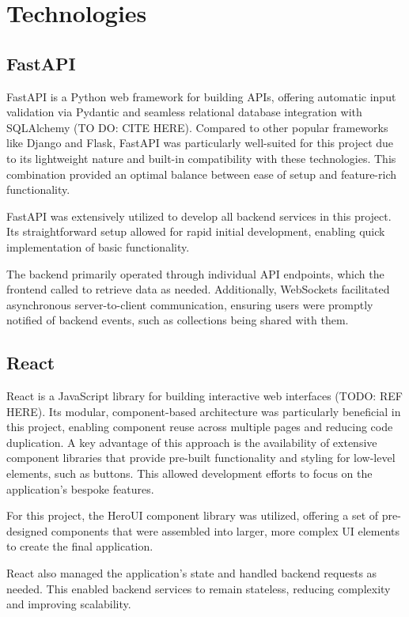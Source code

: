 \section{Technologies}
\subsection{FastAPI}
FastAPI is a Python web framework for building APIs, offering automatic input validation via Pydantic and seamless relational database integration with SQLAlchemy (TO DO: CITE HERE). Compared to other popular frameworks like Django and Flask, FastAPI was particularly well-suited for this project due to its lightweight nature and built-in compatibility with these technologies. This combination provided an optimal balance between ease of setup and feature-rich functionality.

FastAPI was extensively utilized to develop all backend services in this project. Its straightforward setup allowed for rapid initial development, enabling quick implementation of basic functionality.

The backend primarily operated through individual API endpoints, which the frontend called to retrieve data as needed. Additionally, WebSockets facilitated asynchronous server-to-client communication, ensuring users were promptly notified of backend events, such as collections being shared with them.

\subsection{React}
React is a JavaScript library for building interactive web interfaces (TODO: REF HERE). Its modular, component-based architecture was particularly beneficial in this project, enabling component reuse across multiple pages and reducing code duplication. A key advantage of this approach is the availability of extensive component libraries that provide pre-built functionality and styling for low-level elements, such as buttons. This allowed development efforts to focus on the application's bespoke features.

For this project, the HeroUI component library was utilized, offering a set of pre-designed components that were assembled into larger, more complex UI elements to create the final application.

React also managed the application's state and handled backend requests as needed. This enabled backend services to remain stateless, reducing complexity and improving scalability.

